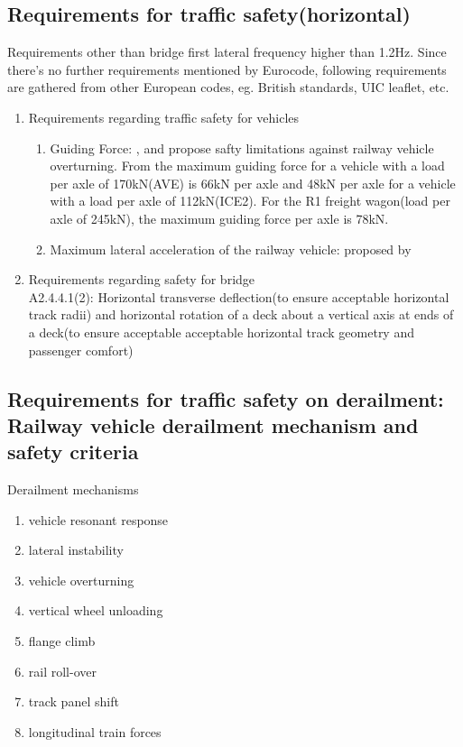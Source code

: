 \subsection{Requirements for traffic safety(horizontal)}
Requirements other than bridge first lateral frequency higher than 1.2Hz. Since there's no further requirements mentioned by Eurocode, following requirements are gathered from other European codes, eg. British standards, UIC leaflet, etc.

\begin{enumerate}[-]
    \item Requirements regarding traffic safety for vehicles
    \begin{enumerate}
        \item Guiding Force: \cite{code2005518} , \cite{en200714363} and\cite{cuadrado2008analysis} propose safty limitations against railway vehicle overturning. From\cite{en200714363} the maximum guiding force for a vehicle with a load per axle of 170kN(AVE) is 66kN per axle and 48kN per axle for a vehicle with a load per axle of 112kN(ICE2). For the R1 freight wagon(load per axle of 245kN), the maximum guiding force per axle is 78kN.
        \item Maximum lateral acceleration of the railway vehicle: proposed by \cite{13803}
    \end{enumerate}
    \item Requirements regarding safety for bridge\\
    \cite{EC0} A2.4.4.1(2): Horizontal transverse deflection(to ensure acceptable horizontal track radii) and horizontal rotation of a deck about a vertical axis at ends of a deck(to ensure acceptable acceptable horizontal track geometry and passenger comfort)
\end{enumerate}


\subsection{Requirements for traffic safety on derailment: Railway vehicle derailment mechanism and safety criteria}

Derailment mechanisms
\begin{enumerate}
    \item vehicle resonant response
    \item lateral instability
    \item vehicle overturning
    \item vertical wheel unloading
    \item flange climb
    \item rail roll-over
    \item track panel shift
    \item longitudinal train forces
\end{enumerate}

